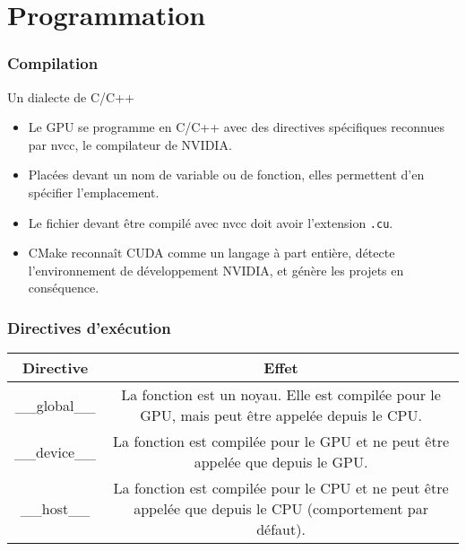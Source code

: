 \section{Programmation}
\begin{frame}
    \frametitle{Compilation}
\begin{block}{Un dialecte de C/C++}
    \begin{itemize}
        \item<+-> Le GPU se programme en C/C++ avec des directives spécifiques reconnues par nvcc, le 
        compilateur de NVIDIA.
        \item<+-> Placées devant un nom de variable ou de fonction, elles permettent d'en spécifier l'emplacement.
        \item<+-> Le fichier devant être compilé avec nvcc doit avoir l'extension \texttt{.cu}.
        \item<+-> CMake reconnaît CUDA comme un langage à part entière, détecte l'environnement de développement NVIDIA, et génère les projets en conséquence.
    \end{itemize}
\end{block}
\end{frame}
\begin{frame}
    \frametitle{Directives d'exécution}
    \renewcommand{\arraystretch}{2}
    \vskip 20pt
    \begin{tabular}{|c|c|}
        \hline
        \rowcolor{lightgray} Directive & Effet \\ \hline
        \_\_global\_\_ & \begin{minipage}{0.8\textwidth}
            La fonction est un noyau. Elle est compilée pour le GPU, mais peut être appelée depuis le CPU. 
        \end{minipage} \\ \hline
        \_\_device\_\_ & \begin{minipage}{0.8\textwidth}
            La fonction est compilée pour le GPU et ne peut être appelée que depuis le GPU. 
        \end{minipage} \\ \hline
        \_\_host\_\_ & \begin{minipage}{0.8\textwidth}
            La fonction est compilée pour le CPU et ne peut être appelée que depuis le CPU (comportement par défaut). 
        \end{minipage} \\ \hline
    \end{tabular}

\end{frame}
